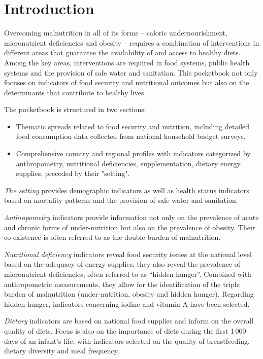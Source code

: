 \section{Introduction}

\bigskip
\bigskip


Overcoming malnutrition in all of its forms – caloric undernourishment, micronutrient deficiencies and obesity – requires a combination of interventions in different areas that guarantee the availability of and access to healthy diets. Among the key areas, interventions are required in food systems, public health systems and the provision of safe water and sanitation. This pocketbook not only focuses on indicators of food security and nutritional outcomes but also on the determinants that contribute to healthy lives. 

The pocketbook is structured in two sections: 
\begin{itemize}
\item Thematic spreads related to food security and nutrition, including detailed food consumption data collected from national household budget surveys,
\item Comprehensive country and regional profiles with indicators categorized by anthropometry, nutritional deficiencies, supplementation, dietary energy supplies, preceded by their "setting".
\end{itemize}

\textit{The setting} provides demographic indicators as well as health status indicators based on mortality patterns and the provision of safe water and sanitation. 

\textit{Anthropometry} indicators provide information not only on the prevalence of acute and chronic forms of under-nutrition but also on the prevalence of obesity. Their co-existence is often referred to as the double burden of malnutrition. 

\textit{Nutritional deficiency} indicators reveal food security issues at the national level based on the adequacy of energy supplies; they also reveal the prevalence of micronutrient deficiencies, often referred to as “hidden hunger”. Combined with anthropometric measurements, they allow for the identification of the triple burden of malnutrition (under-nutrition, obesity and hidden hunger). Regarding hidden hunger, indicators concerning iodine and vitamin A have been selected.

\textit{Dietary} indicators are based on national food supplies and inform on the overall quality of diets. Focus is also on the importance of diets during the first 1\,000 days of an infant’s life, with indicators selected on the quality of breastfeeding, dietary diversity and meal frequency. 

